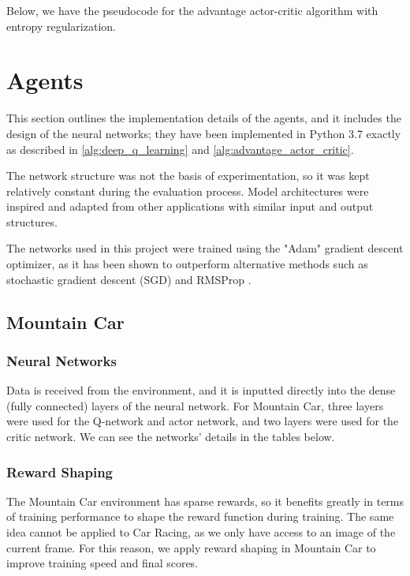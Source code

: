 

Below, we have the pseudocode for the advantage actor-critic algorithm with
entropy regularization.



\section{Agents}

This section outlines the implementation details of the agents, and it includes
the design of the neural networks; they have been implemented in Python 3.7
exactly as described in \autoref{alg:deep_q_learning} and
\autoref{alg:advantage_actor_critic}.

The network structure was not the basis of experimentation, so it was kept
relatively constant during the evaluation process. Model architectures were
inspired and adapted from other applications with similar input and output
structures.

The networks used in this project were trained using the "Adam" gradient
descent optimizer, as it has been shown to outperform alternative methods such
as stochastic gradient descent (SGD) and RMSProp \cite{kingma2014adam}.

\subsection{Mountain Car}

\subsubsection{Neural Networks}
Data is received from the environment, and it is inputted directly into the
dense (fully connected) layers of the neural network. For Mountain Car, three
layers were used for the Q-network and actor network, and two layers were used
for the critic network. We can see the networks' details in the tables below.





\subsubsection{Reward Shaping} \label{sec:reward_shaping}

The Mountain Car environment has sparse rewards, so it benefits greatly in
terms of training performance to shape the reward function during training. The
same idea cannot be applied to Car Racing, as we only have access to an image
of the current frame. For this reason, we apply reward shaping in Mountain Car
to improve training speed and final scores.

